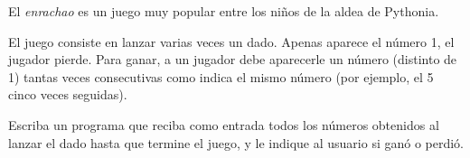El \emph{enrachao} es un juego muy popular
entre los niños de la aldea de Pythonia.

El juego consiste en lanzar varias veces un dado.
Apenas aparece el número 1, el jugador pierde.
Para ganar, a un jugador debe aparecerle un número
(distinto de 1)
tantas veces consecutivas como indica el mismo número
(por ejemplo, el 5 cinco veces seguidas).

Escriba un programa que reciba como entrada
todos los números obtenidos al lanzar el dado
hasta que termine el juego,
y le indique al usuario si ganó o perdió.

\begin{minipage}[t]{.26\textwidth}
  
\end{minipage}
\hspace{1em}
\begin{minipage}[t]{.26\textwidth}
  
\end{minipage}


